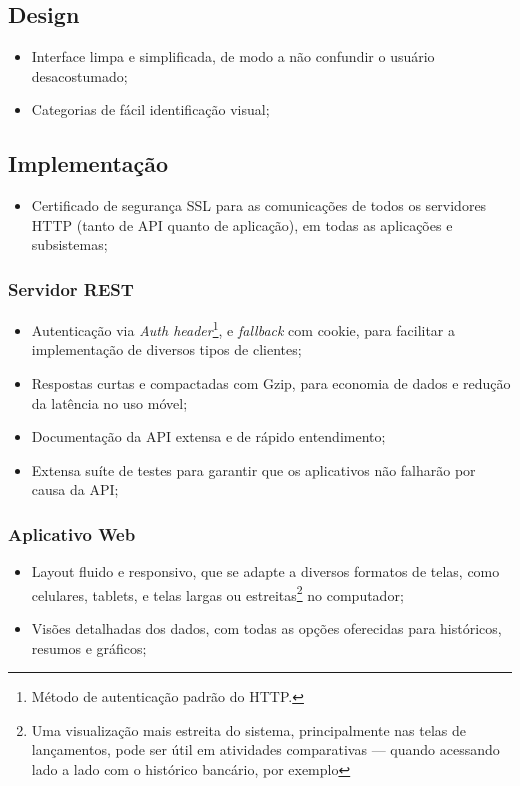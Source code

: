 \documentclass[a4paper]{abnt}
\begin{document}
%
%

\subsection{Design}
\begin{itemize} 
	\item Interface limpa e simplificada, de modo a não confundir o usuário desacostumado;
	\item Categorias de fácil identificação visual;
\end{itemize}

\subsection{Implementação}
\begin{itemize} 
	\item Certificado de segurança SSL para as comunicações de todos os servidores HTTP (tanto de API quanto de aplicação), em todas as aplicações e subsistemas;
\end{itemize}

\subsubsection{Servidor REST}
\begin{itemize} 
	\item Autenticação via \emph{Auth header}\footnote{Método de autenticação padrão do HTTP.}, e \emph{fallback} com cookie, para facilitar a implementação de diversos tipos de clientes\cite{auth};
	\item Respostas curtas e compactadas com Gzip, para economia de dados e redução da latência no uso móvel;
	\item Documentação da API extensa e de rápido entendimento;
	\item Extensa suíte de testes para garantir que os aplicativos não falharão por causa da API;
\end{itemize}

\subsubsection{Aplicativo Web}
\begin{itemize}
	\item Layout fluido e responsivo, que se adapte a diversos formatos de telas, como celulares, tablets, e telas largas ou estreitas\footnote{Uma visualização mais estreita do sistema, principalmente nas telas de lançamentos, pode ser útil em atividades comparativas --- quando acessando lado a lado com o histórico bancário, por exemplo} no computador;
	\item Vis\~oes detalhadas dos dados, com todas as opç\~oes oferecidas para históricos, resumos e gráficos;
\end{itemize}
\end{document}
